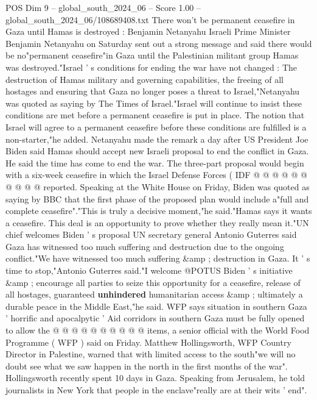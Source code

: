 \begin{textsample}{POS Dim 9 – global\_south\_2024\_06 – Score 1.00 – global\_south\_2024\_06/108689408.txt}  \label{ex:f9_pos_053}
There won't be permanent ceasefire in Gaza until Hamas is destroyed : Benjamin Netanyahu Israeli Prime Minister Benjamin Netanyahu on Saturday sent out a strong message and said there would be no"permanent ceasefire"in Gaza until the Palestinian militant group Hamas was destroyed."Israel ' s conditions for ending the war have not changed : The destruction of Hamas military and governing capabilities, the freeing of all hostages and ensuring that Gaza no longer poses a threat to Israel,"Netanyahu was quoted as saying by The Times of Israel."Israel will continue to insist these conditions are met before a permanent ceasefire is put in place.
The notion that Israel will agree to a permanent ceasefire before these conditions are fulfilled is a non-starter,"he added.
Netanyahu made the remark a day after US President Joe Biden said Hamas should accept new Israeli proposal to end the conflict in Gaza.
He said the time has come to end the war.
The three-part proposal would begin with a six-week ceasefire in which the Israel Defense Forces ( IDF @ @ @ @ @ @ @ @ @ @ reported.
Speaking at the White House on Friday, Biden was quoted as saying by BBC that the first phase of the proposed plan would include a"full and complete ceasefire"."This is truly a decisive moment,"he said."Hamas says it wants a ceasefire.
This deal is an opportunity to prove whether they really mean it."UN chief welcomes Biden ' s proposal UN secretary general Antonio Guterres said Gaza has witnessed too much suffering and destruction due to the ongoing conflict."We have witnessed too much suffering \&amp ; destruction in Gaza.
It ' s time to stop,"Antonio Guterres said."I welcome @POTUS Biden ' s initiative \&amp ; encourage all parties to seize this opportunity for a ceasefire, release of all hostages, guaranteed \textbf{unhindered} humanitarian access \&amp ; ultimately a durable peace in the Middle East,"he said.
WFP says situation in southern Gaza ' horrific and apocalpytic ' Aid corridors in southern Gaza must be fully opened to allow the @ @ @ @ @ @ @ @ @ @ items, a senior official with the World Food Programme ( WFP ) said on Friday.
Matthew Hollingsworth, WFP Country Director in Palestine, warned that with limited access to the south"we will no doubt see what we saw happen in the north in the first months of the war".
Hollingsworth recently spent 10 days in Gaza.
Speaking from Jerusalem, he told journalists in New York that people in the enclave"really are at their wits ' end".

\end{textsample}
